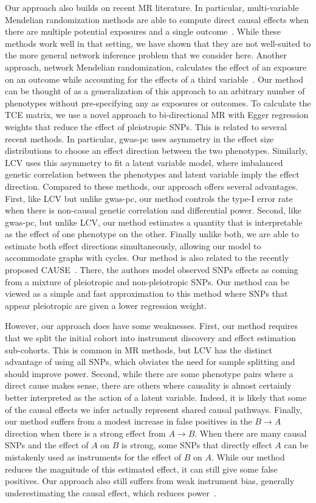 \documentclass{article}
\begin{document}
Our approach also builds on recent MR literature. In particular, multi-variable Mendelian
randomization methods are able to compute direct causal effects when there
are multiple potential exposures and a single outcome~\cite{Zuber2020,Burgess2015a}. While
these methods work well in that setting, we have shown that they are not well-suited
to the more general network inference problem that we consider here. Another approach, network
Mendelian randomization, calculates the effect of an exposure on an outcome while
accounting for the effects of a third variable~\cite{Burgess2015}. Our method can
be thought of as a generalization of this approach to an arbitrary number of phenotypes
without pre-specifying any as exposures or outcomes. To calculate the TCE matrix, we use
a novel approach to bi-directional MR with Egger regression weights that reduce the effect
of pleiotropic SNPs. This is related to several recent methods.
In particular, gwas-pc uses asymmetry in the effect size distributions
to choose an effect direction between the two phenotypes. Similarly, 
LCV uses this asymmetry to fit a latent variable model, where imbalanced
genetic correlation between the phenotypes and latent variable imply
the effect direction. Compared to these methods, our approach offers several
advantages. First, like LCV but unlike gwas-pc, our method controls the type-I error rate
when there is non-causal genetic correlation and differential power. Second, like gwas-pc,
but unlike LCV, our method estimates a quantity that is interpretable as the
effect of one phenotype on the other. Finally unlike both,
we are able to estimate both effect directions simultaneously, allowing our
model to accommodate graphs with cycles. Our method is also related to the
recently proposed CAUSE~\cite{Morrison2020}. There, the authors model observed SNPs effects
as coming from a mixture of pleiotropic and non-pleiotropic SNPs. Our method can be viewed as
a simple and fast approximation to this method where SNPs that appear pleiotropic are given a lower
regression weight.

However, our approach does have some weaknesses. First, our method
requires that we split the initial cohort into instrument discovery and
effect estimation sub-cohorts. This is common in MR methods, but LCV has
the distinct advantage of using all SNPs, which obviates the need
for sample splitting and should improve power. Second, while there are some
phenotype pairs where a direct cause makes sense, there are others where causality is 
almost certainly better interpreted as the action of a latent variable. Indeed, it is likely
that some of the causal effects we infer actually represent shared causal pathways.
Finally, our method suffers from a modest increase in false positives in the $B\rightarrow A$
direction when there is a strong effect from $A\rightarrow B$. When there are many
causal SNPs and the effect of $A$ on $B$ is strong, some SNPs that directly effect $A$
can be mistakenly used as instruments for the effect of $B$ on $A$. While our method
reduces the magnitude of this estimated effect, it can still give some false positives.
Our approach also still suffers from weak instrument bias, generally underestimating
the causal effect, which reduces power~\cite{Davies2015}.
\end{document}
